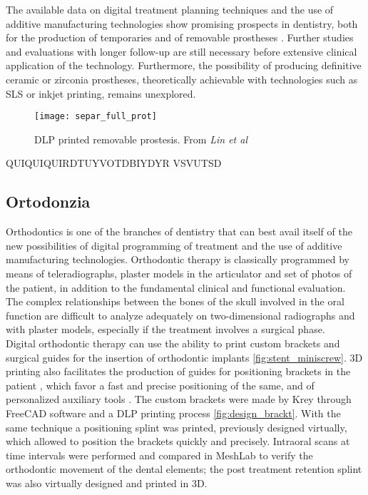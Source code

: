 The available data on digital treatment planning techniques and the use of additive manufacturing technologies show promising prospects in dentistry, both for the production of temporaries \parencite{Reference125} and of removable prostheses \parencite{Reference107}. Further studies and evaluations with longer follow-up are still necessary before extensive clinical application of the technology. Furthermore, the possibility of producing definitive ceramic or zirconia prostheses, theoretically achievable with technologies such as SLS or inkjet printing, remains unexplored.
\begin{figure}[h]
\vspace{-10pt}
	\begin{center}
	\texttt{[image: separ\_full\_prot]}
    \caption{DLP printed removable prostesis. From \emph{Lin et al} \parencite{Reference108}}
    \label{fig:separ_full_prot}
    \end{center}
\vspace{-30pt}
\end{figure}

QUIQUIQUIRDTUYVOTDBIYDYR VSVUTSD

\subsection{Ortodonzia}
Orthodontics is one of the branches of dentistry that can best avail itself of the new possibilities of digital programming of treatment and the use of additive manufacturing technologies. Orthodontic therapy is classically programmed by means of teleradiographs, plaster models in the articulator and set of photos of the patient, in addition to the fundamental clinical and functional evaluation. The complex relationships between the bones of the skull involved in the oral function are difficult to analyze adequately on two-dimensional radiographs and with plaster models, especially if the treatment involves a surgical phase.\\
Digital orthodontic therapy can use the ability to print custom brackets \parencite{Reference115} and surgical guides for the insertion of orthodontic implants \parencite{Reference116} \ref{fig:stent_miniscrew}. 3D printing also facilitates the production of guides for positioning brackets in the patient \parencite{Reference127}, which favor a fast and precise positioning of the same, and of personalized auxiliary tools \parencite{Reference126}. The custom brackets were made by Krey through FreeCAD software and a DLP printing process \ref{fig:design_brackt}. With the same technique a positioning splint was printed, previously designed virtually, which allowed to position the brackets quickly and precisely. Intraoral scans at time intervals were performed and compared in MeshLab to verify the orthodontic movement of the dental elements; the post treatment retention splint was also virtually designed and printed in 3D. \\

